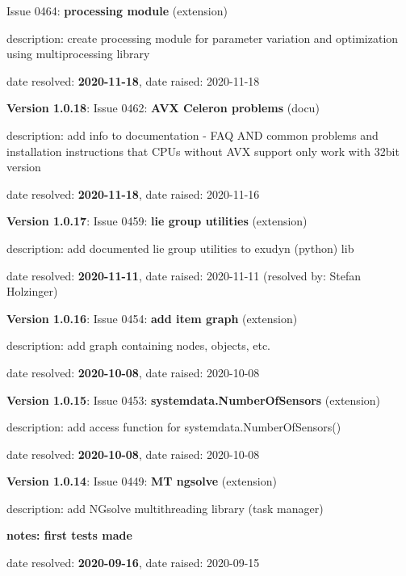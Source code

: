   Issue 0464: {\bf processing module}
(extension)
  \bi
  \item {\small description: create processing module for parameter variation and optimization using multiprocessing library}
  \item   date resolved: {\bf 2020-11-18},
date raised: 2020-11-18   \ei
  \item {\bf Version 1.0.18}: \vspace{-6pt} 
  Issue 0462: {\bf AVX Celeron problems}
(docu)
  \bi
  \item {\small description: add info to documentation - FAQ AND common problems and installation instructions that CPUs without AVX support only work with 32bit version}
  \item   date resolved: {\bf 2020-11-18},
date raised: 2020-11-16   \ei
  \item {\bf Version 1.0.17}: \vspace{-6pt} 
  Issue 0459: {\bf lie group utilities}
(extension)
  \bi
  \item {\small description: add documented lie group utilities to exudyn (python) lib}
  \item   date resolved: {\bf 2020-11-11},
date raised: 2020-11-11 (resolved by: Stefan Holzinger)
  \ei
  \item {\bf Version 1.0.16}: \vspace{-6pt} 
  Issue 0454: {\bf add item graph}
(extension)
  \bi
  \item {\small description: add graph containing nodes, objects, etc.}
  \item   date resolved: {\bf 2020-10-08},
date raised: 2020-10-08   \ei
  \item {\bf Version 1.0.15}: \vspace{-6pt} 
  Issue 0453: {\bf systemdata.NumberOfSensors}
(extension)
  \bi
  \item {\small description: add access function for systemdata.NumberOfSensors()}
  \item   date resolved: {\bf 2020-10-08},
date raised: 2020-10-08   \ei
  \item {\bf Version 1.0.14}: \vspace{-6pt} 
  Issue 0449: {\bf MT ngsolve}
(extension)
  \bi
  \item {\small description: add NGsolve multithreading library (task manager)}
  \item {\small \bf notes: first tests made}
  \item   date resolved: {\bf 2020-09-16},
date raised: 2020-09-15   \ei
